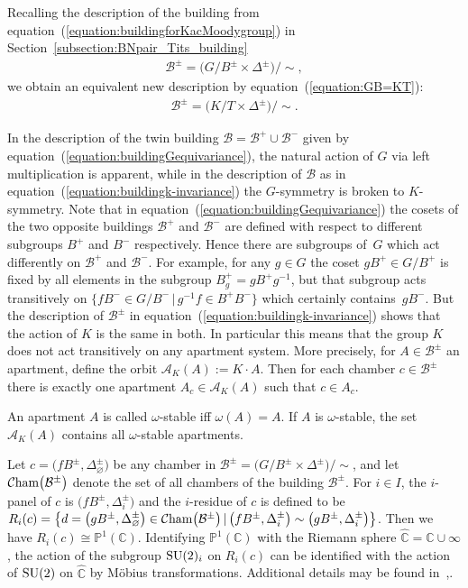 \documentclass[pdftex]{sigma}
\numberwithin{equation}{section}
\def\C{{\mathbb C}}
\def\P{{\mathbb P}}
\def\cA{\mathcal A}
\def\cB{\mathcal B}
\def\cCham{{\mathcal C}{\rm ham}}
\begin{document}
Recalling the description of the building from equation~(\ref{equation:buildingforKacMoodygroup}) in Section~\ref{subsection:BNpair_Tits_building}
\begin{gather}\label{equation:buildingGequivariance}
\cB^{\pm}=\big(G/B^{\pm}\times \Delta^{\pm}\big)/{\sim},
\end{gather}
we obtain an equivalent new description by equation~(\ref{equation:GB=KT}):
\begin{gather}\label{equation:buildingk-invariance}
\cB^{\pm}=\big(K/T\times \Delta^{\pm}\big)/{\sim}.
\end{gather}

In the description of the twin building $\cB=\cB^+\cup \cB^-$ given by equation~(\ref{equation:buildingGequivariance}), the natural action of $G$ via left multiplication is apparent, while in the description of $\cB$ as in equation~(\ref{equation:buildingk-invariance}) the $G$-symmetry is broken to $K$-symmetry. Note that in equation~(\ref{equation:buildingGequivariance}) the cosets of the two opposite buildings $\cB^+$ and $\cB^-$ are defined with respect to different subgroups $B^+$ and $B^-$ respectively. Hence there are subgroups of~$G$ which act differently on $\cB^+$ and $\cB^-$. For example, for any $g\in G$ the coset $gB^+\in G/B^+$ is fixed by all elements in the subgroup
$B^+_g=gB^+g^{-1}$, but that subgroup acts transitively on $\big\{fB^-\in G/B^-\, |\, g^{-1}f\in B^+B^-\big\}$ which certainly contains~$gB^-$. But the description of $\cB^\pm$ in equation~(\ref{equation:buildingk-invariance}) shows that the action of $K$ is the same in both. In particular this means that the group $K$ does not act transitively on any apartment system. More precisely, for $A\in\cB^\pm$ an apartment, define the orbit $\cA_K(A) := K\cdot A$. Then for each chamber $c\in\cB^\pm$ there is exactly one apartment $A_c\in \cA_K(A)$ such that $c\in A_c$.

An apartment $A$ is called $\omega$-stable iff $\omega(A)=A$. If $A$ is $\omega$-stable, the set $\cA_K(A)$ contains all $\omega$-stable apartments.

Let $c = \big(fB^\pm, \Delta_\varnothing^\pm\big)$ be any chamber in $\cB^\pm=\big(G/B^\pm\times \Delta^\pm\big)/{\sim}$, and let $\cCham\big(\cB^\pm\big)$ denote the set of all chambers of the building $\cB^\pm$.
For $i\in I$, the $i$-panel of $c$ is $\big(fB^\pm, \Delta_i^\pm\big)$ and the $i$-residue of $c$ is defined to be
$R_i(c)=\big\{d = \big(gB^\pm, \Delta_\varnothing^\pm\big)\in\cCham\big(\cB^\pm\big)\, |\, \big(fB^\pm, \Delta_i^\pm\big) \sim \big(gB^\pm, \Delta_i^\pm\big) \big\}$. Then we have $R_i(c)\cong \P^1(\C)$. Identifying $\mathbb{P}^1(\C)$ with the Riemann sphere $\widehat{\C}=\C\cup \infty$, the action of the subgroup ${\rm SU}(2)_i$ on $R_i(c)$ can be identified with the action of ${\rm SU}(2)$ on $\widehat{\C}$ by M\"obius transformations. Additional details may be found in~\cite[Chapter~6]{AbramenkoBrown08},.
\end{document}
